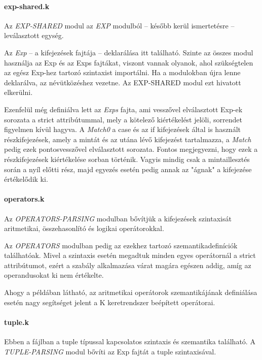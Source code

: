 \paragraph{exp-shared.k}
Az \textit{EXP-SHARED} modul az \textit{EXP} modulból -- később kerül ismertetésre -- leválasztott egység.



Az \textit{Exp} -- a kifejezések fajtája -- deklarálása itt található. Szinte az összes modul használja az Exp és az Exps fajtákat, viszont vannak olyanok, ahol szükségtelen az egész Exp-hez tartozó szintaxist importálni. Ha a modulokban újra lenne deklarálva, az névütközéshez vezetne. Az EXP-SHARED modul ezt hivatott elkerülni.

Ezenfelül még definiálva lett az \textit{Exps} fajta, ami vesszővel elválasztott Exp-ek sorozata a strict attribútummal, mely a kötelező kiértékelést jelöli, sorrendet figyelmen kívül hagyva. A \textit{Match0} a case és az if kifejezések által is használt részkifejezések, amely a mintát és az utána lévő kifejezést tartalmazza, a \textit{Match} pedig ezek pontosvesszővel elválasztott sorozata. Fontos megjegyezni, hogy ezek a részkifejezések kiértékelése sorban történik. Vagyis mindig csak a mintaillesztés során a nyíl előtti rész, majd egyezés esetén pedig annak az "ágnak" a kifejezése értékelődik ki.

\paragraph{operators.k}
Az \textit{OPERATORS-PARSING} modulban bővítjük a kifejezések szintaxisát aritmetikai, összehasonlító és logikai operátorokkal.



Az \textit{OPERATORS} modulban pedig az ezekhez tartozó szemantikadefiníciók találhatóak. Mivel a szintaxis esetén megadtuk minden egyes operátornál a strict attribútumot, ezért a szabály alkalmazása várat magára egészen addig, amíg az operandusokat ki nem értékelte.



Ahogy a példában látható, az aritmetikai operátorok szemantikájának definiálása esetén nagy segítséget jelent a K keretrendszer beépített operátorai.

\paragraph{tuple.k}
Ebben a fájlban a tuple típussal kapcsolatos szintaxis és szemantika található. A \textit{TUPLE-PARSING} modul bővíti az Exp fajtát a tuple szintaxisával.

